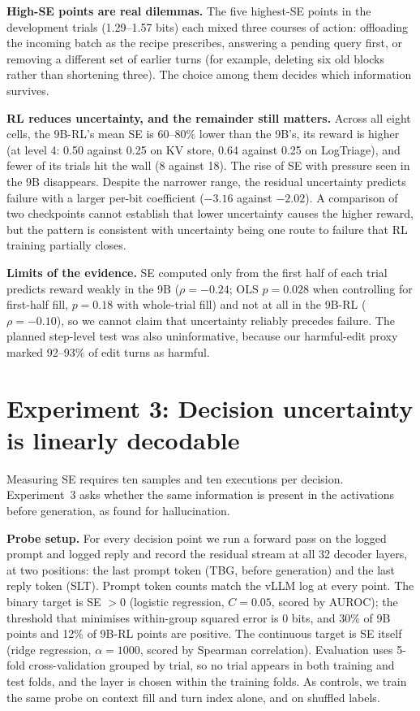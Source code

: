 \documentclass{article}
\begin{document}
\textbf{High-SE points are real dilemmas.} The five highest-SE points in the development trials (1.29--1.57 bits) each mixed three courses of action: offloading the incoming batch as the recipe prescribes, answering a pending query first, or removing a different set of earlier turns (for example, deleting six old blocks rather than shortening three).
The choice among them decides which information survives.

\textbf{RL reduces uncertainty, and the remainder still matters.} Across all eight cells, the 9B-RL's mean SE is 60--80\% lower than the 9B's, its reward is higher (at level 4: 0.50 against 0.25 on KV store, 0.64 against 0.25 on LogTriage), and fewer of its trials hit the wall (8 against 18).
The rise of SE with pressure seen in the 9B disappears.
Despite the narrower range, the residual uncertainty predicts failure with a larger per-bit coefficient ($-3.16$ against $-2.02$).
A comparison of two checkpoints cannot establish that lower uncertainty causes the higher reward, but the pattern is consistent with uncertainty being one route to failure that RL training partially closes.

\textbf{Limits of the evidence.} SE computed only from the first half of each trial predicts reward weakly in the 9B ($\rho=-0.24$; OLS $p=0.028$ when controlling for first-half fill, $p=0.18$ with whole-trial fill) and not at all in the 9B-RL ($\rho=-0.10$), so we cannot claim that uncertainty reliably precedes failure.
The planned step-level test was also uninformative, because our harmful-edit proxy marked 92--93\% of edit turns as harmful.

\section{Experiment 3: Decision uncertainty is linearly decodable}
\label{sec:exp3}

Measuring SE requires ten samples and ten executions per decision.
Experiment~3 asks whether the same information is present in the activations before generation, as \citet{kossen2024sep} found for hallucination.

\textbf{Probe setup.} For every decision point we run a forward pass on the logged prompt and logged reply and record the residual stream at all 32 decoder layers, at two positions: the last prompt token (TBG, before generation) and the last reply token (SLT).
Prompt token counts match the vLLM log at every point.
The binary target is SE $>0$ (logistic regression, $C=0.05$, scored by AUROC); the threshold that minimises within-group squared error is 0 bits, and 30\% of 9B points and 12\% of 9B-RL points are positive.
The continuous target is SE itself (ridge regression, $\alpha=1000$, scored by Spearman correlation).
Evaluation uses 5-fold cross-validation grouped by trial, so no trial appears in both training and test folds, and the layer is chosen within the training folds.
As controls, we train the same probe on context fill and turn index alone, and on shuffled labels.
\end{document}
